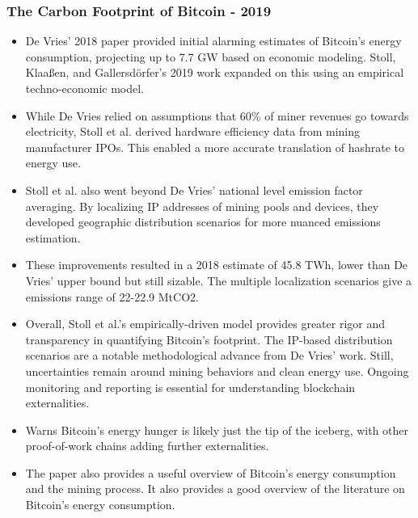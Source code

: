 \documentclass{article}
\begin{document}
\subsubsection*{The Carbon Footprint of Bitcoin - 2019} \cite{stollCarbonFootprintBitcoin2019}
\begin{itemize}
    \item De Vries' 2018 paper provided initial alarming estimates of Bitcoin's energy consumption, projecting up to 7.7 GW based on economic modeling. Stoll, Klaaßen, and Gallersdörfer's 2019 work expanded on this using an empirical techno-economic model.
    \item While De Vries relied on assumptions that 60\% of miner revenues go towards electricity, Stoll et al. derived hardware efficiency data from mining manufacturer IPOs. This enabled a more accurate translation of hashrate to energy use.
    \item Stoll et al. also went beyond De Vries' national level emission factor averaging. By localizing IP addresses of mining pools and devices, they developed geographic distribution scenarios for more nuanced emissions estimation.
    \item These improvements resulted in a 2018 estimate of 45.8 TWh, lower than De Vries' upper bound but still sizable. The multiple localization scenarios give a emissions range of 22-22.9 MtCO2.
    \item Overall, Stoll et al.'s empirically-driven model provides greater rigor and transparency in quantifying Bitcoin's footprint. The IP-based distribution scenarios are a notable methodological advance from De Vries' work. Still, uncertainties remain around mining behaviors and clean energy use. Ongoing monitoring and reporting is essential for understanding blockchain externalities.
    \item Warns Bitcoin's energy hunger is likely just the tip of the iceberg, with other proof-of-work chains adding further externalities.
    \item The paper also provides a useful overview of Bitcoin's energy consumption and the mining process. It also provides a good overview of the literature on Bitcoin's energy consumption.
\end{itemize}
\end{document}
